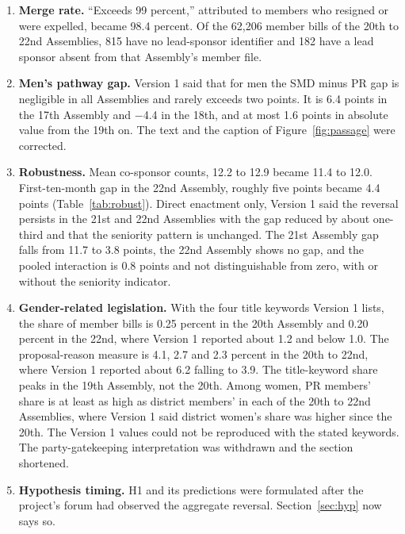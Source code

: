 \documentclass[11pt]{article}
\begin{document}
{\begin{enumerate}
\item \textbf{Merge rate.} ``Exceeds 99 percent,'' attributed to members who resigned or were expelled, became 98.4 percent. Of the 62,206 member bills of the 20th to 22nd Assemblies, 815 have no lead-sponsor identifier and 182 have a lead sponsor absent from that Assembly's member file.
\item \textbf{Men's pathway gap.} Version 1 said that for men the SMD minus PR gap is negligible in all Assemblies and rarely exceeds two points. It is 6.4 points in the 17th Assembly and $-$4.4 in the 18th, and at most 1.6 points in absolute value from the 19th on. The text and the caption of Figure~\ref{fig:passage} were corrected.
\item \textbf{Robustness.} Mean co-sponsor counts, 12.2 to 12.9 became 11.4 to 12.0. First-ten-month gap in the 22nd Assembly, roughly five points became 4.4 points (Table~\ref{tab:robust}). Direct enactment only, Version 1 said the reversal persists in the 21st and 22nd Assemblies with the gap reduced by about one-third and that the seniority pattern is unchanged. The 21st Assembly gap falls from 11.7 to 3.8 points, the 22nd Assembly shows no gap, and the pooled interaction is 0.8 points and not distinguishable from zero, with or without the seniority indicator.
\item \textbf{Gender-related legislation.} With the four title keywords Version 1 lists, the share of member bills is 0.25 percent in the 20th Assembly and 0.20 percent in the 22nd, where Version 1 reported about 1.2 and below 1.0. The proposal-reason measure is 4.1, 2.7 and 2.3 percent in the 20th to 22nd, where Version 1 reported about 6.2 falling to 3.9. The title-keyword share peaks in the 19th Assembly, not the 20th. Among women, PR members' share is at least as high as district members' in each of the 20th to 22nd Assemblies, where Version 1 said district women's share was higher since the 20th. The Version 1 values could not be reproduced with the stated keywords. The party-gatekeeping interpretation was withdrawn and the section shortened.
\item \textbf{Hypothesis timing.} H1 and its predictions were formulated after the project's forum had observed the aggregate reversal. Section~\ref{sec:hyp} now says so.

\end{enumerate}}
\end{document}
